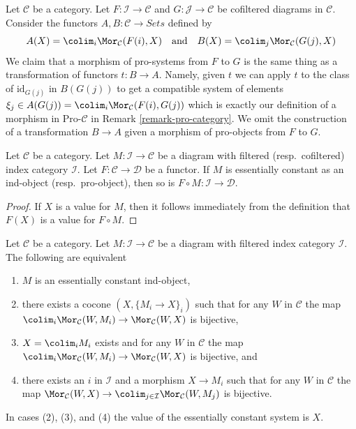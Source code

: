\begin{remark}
\label{remark-pro-category-copresheaves}
Let $\mathcal{C}$ be a category. Let $F : \mathcal{I} \to \mathcal{C}$ and
$G : \mathcal{J} \to \mathcal{C}$ be cofiltered diagrams in $\mathcal{C}$.
Consider the functors $A, B : \mathcal{C} \to \textit{Sets}$ defined by
$$
A(X) = \colim_i \Mor_\mathcal{C}(F(i), X)
\quad\text{and}\quad
B(X) = \colim_j \Mor_\mathcal{C}(G(j), X)
$$
We claim that a morphism of pro-systems from $F$ to $G$ is the same thing
as a transformation of functors $t : B \to A$. Namely, given $t$
we can apply $t$ to the class of $\text{id}_{G(j)}$ in $B(G(j))$
to get a compatible system of elements
$\xi_j \in A(G(j)) = \colim_i \Mor_\mathcal{C}(F(i), G(j))$
which is exactly our definition of a morphism in $\text{Pro-}\mathcal{C}$ in
Remark \ref{remark-pro-category}. We omit the construction of a
transformation $B \to A$ given a morphism of pro-objects from $F$ to $G$.
\end{remark}

\begin{lemma}
\label{lemma-image-essentially-constant}
Let $\mathcal{C}$ be a category. Let $M : \mathcal{I} \to \mathcal{C}$
be a diagram with filtered (resp.\ cofiltered) index category $\mathcal{I}$.
Let $F : \mathcal{C} \to \mathcal{D}$ be a functor.
If $M$ is essentially constant as an ind-object (resp.\ pro-object),
then so is $F \circ M : \mathcal{I} \to \mathcal{D}$.
\end{lemma}

\begin{proof}
If $X$ is a value for $M$, then it follows immediately from the
definition that $F(X)$ is a value for $F \circ M$.
\end{proof}

\begin{lemma}
\label{lemma-characterize-essentially-constant-ind}
Let $\mathcal{C}$ be a category. Let $M : \mathcal{I} \to \mathcal{C}$
be a diagram with filtered index category $\mathcal{I}$.
The following are equivalent
\begin{enumerate}
\item $M$ is an essentially constant ind-object,
\item there exists a cocone $(X, \{M_i \to X\}_i)$ such that for any
$W$ in $\mathcal{C}$ the map
$\colim_i \Mor_\mathcal{C}(W, M_i) \to \Mor_\mathcal{C}(W, X)$
is bijective,
\item $X = \colim_i M_i$ exists and for any $W$ in $\mathcal{C}$
the map
$\colim_i \Mor_\mathcal{C}(W, M_i) \to \Mor_\mathcal{C}(W, X)$
is bijective, and
\item there exists an $i$ in $\mathcal{I}$ and a morphism $X \to M_i$
such that for any $W$ in $\mathcal{C}$ the map $\Mor_\mathcal{C}(W, X) \to
\colim_{j \in \mathcal{I}} \Mor_\mathcal{C}(W, M_j)$
is bijective.
\end{enumerate}
In cases (2), (3), and (4) the value of the essentially constant system is $X$.
\end{lemma}

